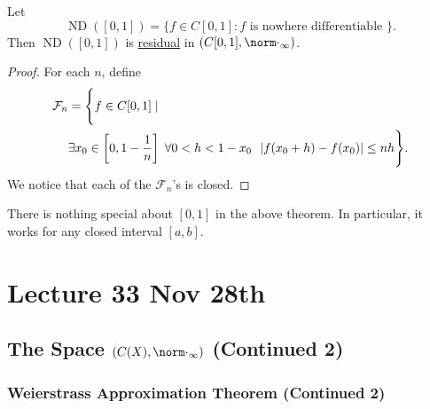 \documentclass[notoc,notitlepage]{tufte-book}
\DeclareMathOperator{\ND}{ND }
\begin{document}
\begin{thm}\label{thm:banach_mazurkiewickz_theorem}
  Let
  \begin{equation*}
    \ND([0, 1]) = \{ f \in C[0, 1] : f \text{ is nowhere differentiable } \}.
  \end{equation*}
  Then $\ND([0, 1])$ is \hyperref[defn:residual]{residual} in $(C[0, 1], \norm\cdot_\infty)$.
\end{thm}

\begin{proof}
  For each $n$, define
  \begin{align*}
    \mathcal{F}_n &= \Bigg\{ f \in C[0, 1] \mid \\
                  & \exists x_0 \in \left[0, 1 - \frac{1}{n}\right] \; \forall 0 < h < 1 - x_0 \enspace \left| f(x_0 + h) - f(x_0) \right| \leq nh \Bigg\}.
  \end{align*}
  We notice that each of the $\mathcal{F}_n$'s is closed.  %
\end{proof}

\begin{remark}
  There is nothing special about $[0, 1]$ in the above theorem. In particular, it works for any closed interval $[a, b]$.
\end{remark}




\chapter{Lecture 33 Nov 28th}%
\label{chp:lecture_33_nov_28th}

\section{The Space $(C(X), \norm\cdot_\infty)$ (Continued 2)}%
\label{sec:the_space_c_x_normcdot_infty_continued_2}

\subsection{Weierstrass Approximation Theorem (Continued 2)}%
\label{sub:weierstrass_approximation_theorem_continued_2}
\end{document}
